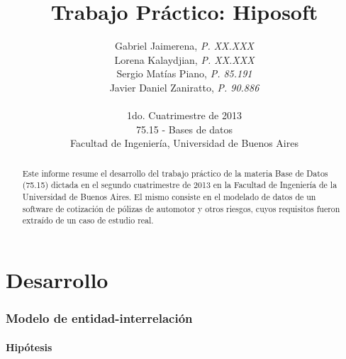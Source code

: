 \documentclass[a4paper,11pt]{article}
\title{\textbf{Trabajo Práctico: Hiposoft}}
\author{
  Gabriel Jaimerena,      \textit{P. XX.XXX}                      \\
  Lorena Kalaydjian,     \textit{P. XX.XXX}                      \\
  Sergio Matías Piano,     \textit{P. 85.191}                      \\
  Javier Daniel Zaniratto, \textit{P. 90.886}                      \\
  \\
  \normalsize{1do. Cuatrimestre de 2013}                           \\
  \normalsize{75.15 - Bases de datos}                              \\
  \normalsize{Facultad de Ingeniería, Universidad de Buenos Aires}
}
\date{}
\begin{document}
\thispagestyle{empty}
\maketitle

\begin{abstract}

  Este informe resume el desarrollo del trabajo práctico de la materia Base
  de Datos (75.15) dictada en el segundo cuatrimestre de 2013 en la Facultad de
  Ingeniería de la Universidad de Buenos Aires. El mismo consiste en el
  modelado de datos de un software de cotización de pólizas de automotor y otros riesgos,
  cuyos requisitos fueron extraído de un caso de estudio real.

\end{abstract}

\clearpage

\tableofcontents
\clearpage


\part{Desarrollo}


\section{Modelo de entidad-interrelación} \label{sec:der}

\subsection{Hipótesis}
\end{document}
